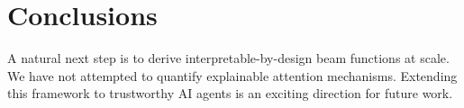 \section{Conclusions}\label{sec:conclusions}

A natural next step is to derive interpretable-by-design beam functions
at scale. We have not attempted to quantify explainable attention
mechanisms. Extending this framework to trustworthy AI agents is an
exciting direction for future work.

